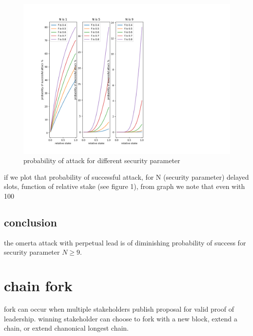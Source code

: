 \documentclass{article}
\begin{document}
\begin{figure}
  \includegraphics[scale=0.8,left]{prob.png}
  \caption{probability of attack for different security parameter }
\end{figure}


if we plot that probability of successful attack, for N (security parameter) delayed slots, function of relative stake (see figure 1), from graph we  note that even with 100%

\subsection {conclusion}
the omerta attack with perpetual lead is of diminishing probability of success for security parameter $N \ge 9$.

\section{chain fork}
fork can occur when multiple stakeholders publish proposal for valid proof of leadership.
winning stakeholder can choose to fork with a new block, extend a chain, or extend chanonical longest chain.
\end{document}
